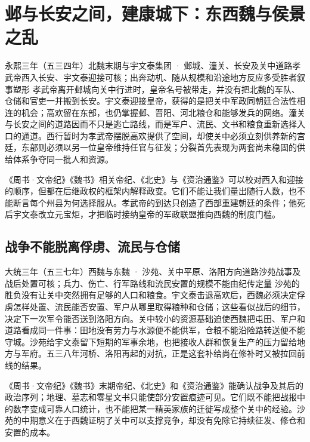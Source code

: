 \section{邺与长安之间，建康城下：东西魏与侯景之乱}
\label{sec:eastern-western-wei-houjing}

\begin{event}{}{永熙三年（五三四年）}{北魏末期与宇文泰集团 · 邺城、潼关、长安及关中道路}{孝武帝西入长安、宇文泰迎接可核；出奔动机、随从规模和沿途地方反应多受胜者叙事塑形}
孝武帝离开邺城向关中行进时，皇帝名号被带走，并没有把北魏的军队、仓储和官吏一并搬到长安。宇文泰迎接皇帝，获得的是把关中军政同朝廷合法性相连的机会；高欢留在东部，也仍掌握邺、晋阳、河北粮仓和能够发兵的网络。潼关与长安之间的道路因而不只是逃亡路线，而是军户、流民、文书和粮食重新选择入口的通道。西行暂时为孝武帝摆脱高欢提供了空间，却使关中必须立刻供养新的宫廷，东部则必须以另一位皇帝维持任官与征发；分裂首先表现为两套尚未稳固的供给体系争夺同一批人和资源。

《周书·文帝纪》《魏书》相关帝纪、《北史》与《资治通鉴》可以校对西入和迎接的顺序，但都在后继政权的框架内解释政变。它们不能让我们量出随行人数，也不能断言每个州县为何选择服从。孝武帝的到达只创造了西部重建朝廷的条件；他死后宇文泰改立元宝炬，才把临时接纳皇帝的军政联盟推向西魏的制度门槛。
\end{event}

\subsection{战争不能脱离俘虏、流民与仓储}

\begin{event}{}{大统三年（五三七年）}{西魏与东魏 · 沙苑、关中平原、洛阳方向道路}{沙苑战事及战后处置可核；兵力、伤亡、行军路线和流民安置的规模不能由纪传定量}
沙苑的胜负没有让关中突然拥有足够的人口和粮食。宇文泰击退高欢后，西魏必须决定俘虏怎样处置、流民能否安置、军户从哪里取得粮种和仓储；这些看似战后的细节，决定下一次军令能否送到洛阳方向。关中较小的资源基础迫使西魏把屯田、军户和道路看成同一件事：田地没有劳力与水源便不能供军，仓粮不能沿险路转送便不能守城。沙苑给宇文泰留下短期的军事余地，也把接收人群和恢复生产的压力留给地方与军府。五三八年河桥、洛阳再起的对抗，正是这套补给尚在修补时又被拉回前线的结果。

《周书·文帝纪》《魏书》末期帝纪、《北史》和《资治通鉴》能确认战争及其后的政治序列；地理、墓志和零星文书只能使部分安置痕迹可见。它们既不能把战报中的数字变成可靠人口统计，也不能把某一精英家族的迁徙写成整个关中的经验。沙苑的中期意义在于西魏证明了关中可以支撑竞争，却没有免除它持续征发、修仓和安置的成本。
\end{event}

